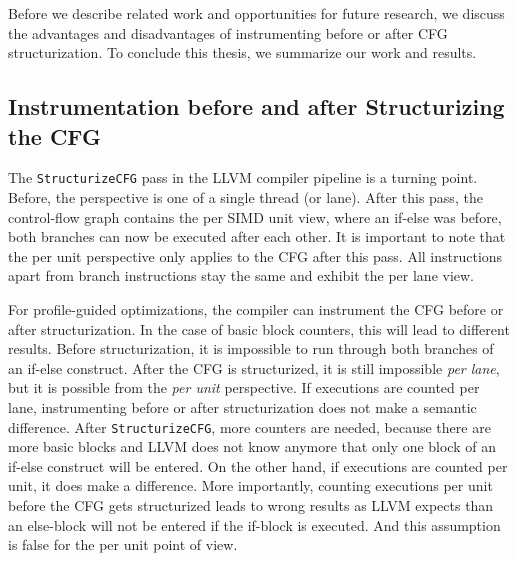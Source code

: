 \clearpage
{}
\label{sec:discussion}
Before we describe related work and opportunities for future research, we discuss the advantages and disadvantages of instrumenting before or after CFG structurization.
To conclude this thesis, we summarize our work and results.

\subsection{Instrumentation before and after Structurizing the CFG}
\label{sub:discussion_structurize}
The \texttt{StructurizeCFG} pass in the LLVM compiler pipeline is a turning point. Before, the perspective is one of a single thread (or lane).
After this pass, the control-flow graph contains the per SIMD unit view, where an if-else was before, both branches can now be executed after each other.
It is important to note that the per unit perspective only applies to the CFG after this pass. All instructions apart from branch instructions stay the same and exhibit the per lane view.

For profile-guided optimizations, the compiler can instrument the CFG before or after structurization. In the case of basic block counters, this will lead to different results.
Before structurization, it is impossible to run through both branches of an if-else construct.
After the CFG is structurized, it is still impossible \emph{per lane}, but it is possible from the \emph{per unit} perspective.
If executions are counted per lane, instrumenting before or after structurization does not make a semantic difference.
After \texttt{StructurizeCFG}, more counters are needed, because there are more basic blocks and LLVM does not know anymore that only one block of an if-else construct will be entered.
On the other hand, if executions are counted per unit, it does make a difference. More importantly, counting executions per unit before the CFG gets structurized leads to wrong results as LLVM expects than an else-block will not be entered if the if-block is executed. And this assumption is false for the per unit point of view.

